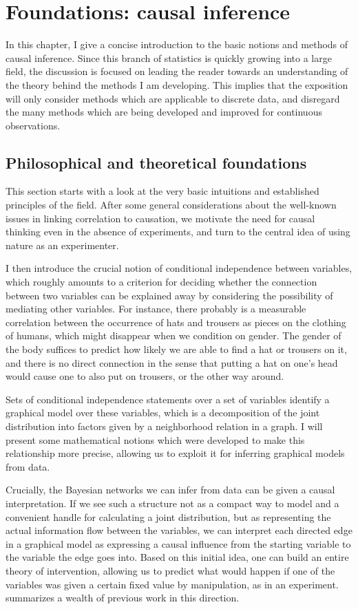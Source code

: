 \chapter{Foundations: causal inference}
In this chapter, I give a concise introduction to the basic notions and methods of causal inference. Since this branch of statistics is quickly growing into a large field, the discussion is focused on leading the reader towards an understanding of the theory behind the methods I am developing. This implies that the exposition will only consider methods which are applicable to discrete data, and disregard the many methods which are being developed and improved for continuous observations.

\section{Philosophical and theoretical foundations}
This section starts with a look at the very basic intuitions and established principles of the field. After some general considerations about the well-known issues in linking correlation to causation, we motivate the need for causal thinking even in the absence of experiments, and turn to the central idea of using nature as an experimenter.

I then introduce the crucial notion of conditional independence between variables, which roughly amounts to a criterion for deciding whether the connection between two variables can be explained away by considering the possibility of mediating other variables. For instance, there probably is a measurable correlation between the occurrence of hats and trousers as pieces on the clothing of humans, which might disappear when we condition on gender. The gender of the body suffices to predict how likely we are able to find a hat or trousers on it, and there is no direct connection in the sense that putting a hat on one's head would cause one to also put on trousers, or the other way around.

Sets of conditional independence statements over a set of variables identify a graphical model over these variables, which is a decomposition of the joint distribution into factors given by a neighborhood relation in a graph. I will present some mathematical notions which were developed to make this relationship more precise, allowing us to exploit it for inferring graphical models from data.

Crucially, the Bayesian networks we can infer from data can be given a causal interpretation. If we see such a structure not as a compact way to model and a convenient handle for calculating a joint distribution, but as representing the actual information flow between the variables, we can interpret each directed edge in a graphical model as expressing a causal influence from the starting variable to the variable the edge goes into. Based on this initial idea, one can build an entire theory of intervention, allowing us to predict what would happen if one of the variables was given a certain fixed value by manipulation, as in an experiment. \cite{pearl2009} summarizes a wealth of previous work in this direction.

